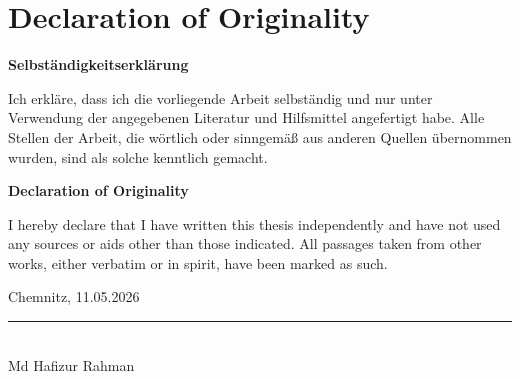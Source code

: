 \chapter*{Declaration of Originality}
\thispagestyle{empty}

\vspace{0.5cm}

\textbf{Selbständigkeitserklärung}

\vspace{0.3cm}

Ich erkläre, dass ich die vorliegende Arbeit selbständig und nur unter Verwendung der angegebenen Literatur und Hilfsmittel angefertigt habe. Alle Stellen der Arbeit, die wörtlich oder sinngemäß aus anderen Quellen übernommen wurden, sind als solche kenntlich gemacht.

\vspace{1cm}

\textbf{Declaration of Originality}

\vspace{0.3cm}

I hereby declare that I have written this thesis independently and have not used any sources or aids other than those indicated. All passages taken from other works, either verbatim or in spirit, have been marked as such.

\vspace{2cm}

\noindent
Chemnitz, 11.05.2026

\vspace{1.5cm}

\noindent
\rule{6cm}{0.4pt}\\
Md Hafizur Rahman
